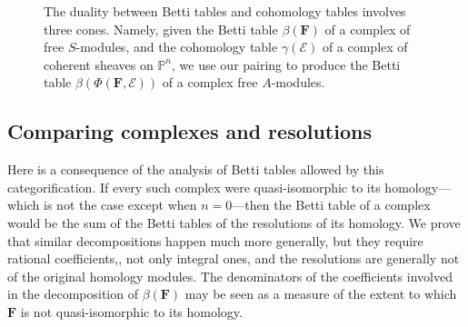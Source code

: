 \documentclass[12pt]{amsart}
\theoremstyle{definition}
\theoremstyle{remark}
\newcommand{\PP}{\mathbb{P}}
\newcommand{\cE}{\mathcal{E}}
\newcommand{\FF}{\mathbf{F}}
\begin{document}
\begin{figure}
\caption{The duality between Betti tables and cohomology tables involves three cones.  Namely, given the Betti table $\beta(\FF)$ of a complex of free $S$-modules, and the cohomology table $\gamma(\cE)$ of a complex of coherent sheaves on $\PP^n$, we use our pairing to produce the Betti table $\beta(\Phi(\FF,\cE))$ of a complex free $A$-modules. 
}
\label{fig:bracket}
\end{figure}





\subsection*{Comparing complexes and resolutions}
Here is a consequence of the analysis of Betti tables allowed by this categorification. If every such complex were quasi-isomorphic to its homology---which is not the case except when $n=0$---then the Betti table of a complex would be the sum of the Betti tables of the resolutions of its homology.  We prove that similar decompositions happen much more generally, but they require rational coefficients,, not only integral ones, and the resolutions are generally not of the original homology modules. The denominators of the coefficients involved in the decomposition of $\beta(\FF)$ may be seen as a measure of the extent to which $\FF$ is not quasi-isomorphic to its homology. 
\end{document}
